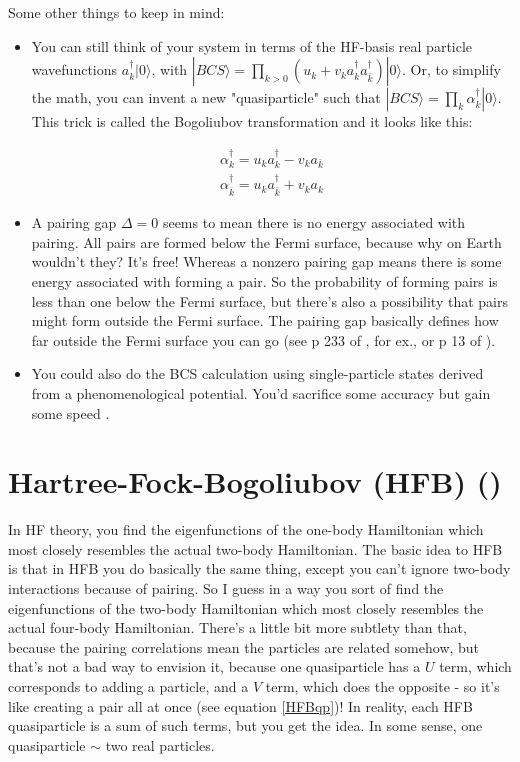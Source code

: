 Some other things to keep in mind:
\begin{itemize}
\item You can still think of your system in terms of the HF-basis real particle wavefunctions $a_k^\dagger |0\rangle$, with $|BCS\rangle = \prod_{k>0}(u_k+v_k a_k^\dagger a_{\bar{k}}^\dagger)|0\rangle$. Or, to simplify the math, you can invent a new "quasiparticle" such that $|BCS\rangle = \prod_{k}\alpha_k^\dagger|0\rangle$. This trick is called the Bogoliubov transformation and it looks like this:

\begin{eqnarray}
\alpha_k^\dagger = u_ka_k^\dagger-v_ka_{\bar{k}} \label{quasiparticle1}\\
\alpha_{\bar{k}}^\dagger = u_ka_{\bar{k}}^\dagger+v_ka_k \label{quasiparticle2}
\end{eqnarray}
\item A pairing gap $\Delta = 0$ seems to mean there is no energy associated with pairing. All pairs are formed below the Fermi surface, because why on Earth wouldn't they? It's free! Whereas a nonzero pairing gap means there is some energy associated with forming a pair. So the probability of forming pairs is less than one below the Fermi surface, but there's also a possibility that pairs might form outside the Fermi surface. The pairing gap basically defines how far outside the Fermi surface you can go (see p 233 of \cite{ring1980nuclear}, for ex., or p 13 of \cite{Balbuena2003}).
\item You could also do the BCS calculation using single-particle states derived from a phenomenological potential. You'd sacrifice some accuracy but gain some speed \cite{Anguiano2013}.
\end{itemize}

\section*{Hartree-Fock-Bogoliubov (HFB)  (\cite{ring1980nuclear,Balbuena2003})}
In HF theory, you find the eigenfunctions of the one-body Hamiltonian which most closely resembles the actual two-body Hamiltonian. The basic idea to HFB is that in HFB you do basically the same thing, except you can't ignore two-body interactions because of pairing. So I guess in a way you sort of find the eigenfunctions of the two-body Hamiltonian which most closely resembles the actual four-body Hamiltonian. There's a little bit more subtlety than that, because the pairing correlations mean the particles are related somehow, but that's not a bad way to envision it, because one quasiparticle has a $U$ term, which corresponds to adding a particle, and a $V$ term, which does the opposite - so it's like creating a pair all at once (see equation \ref{HFBqp})! In reality, each HFB quasiparticle is a sum of such terms, but you get the idea. In some sense, one quasiparticle $\sim$ two real particles.

